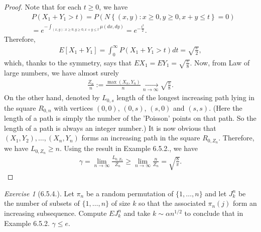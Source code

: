 \documentclass[12pt,a4paper]{amsart}
\theoremstyle{plain}
\theoremstyle{definition}
\theoremstyle{remark}
\newtheorem*{exe}{Exercise}
\numberwithin{equation}{section}
\begin{document}
\begin{proof}
Note that for each $t\geq 0$, we have
\begin{align}
&P(X_1+Y_1 > t) 
= P \left( N\left\{(x,y): x\geq 0, y\geq 0, x+y\leq t \right\} = 0 \right)
\\& = e^{- \int_{(x,y): x\geq 0, y\geq 0, x+y \leq t} \mu(dx,dy)}
= e^{-\frac{t^2}{2}}.
\end{align}
Therefore, 
\begin{align}
E[X_1+Y_1] 
= \int_0^\infty P(X_1 + Y_1 > t) dt 
= \sqrt{\frac{\pi}{2}},
\end{align}
which, thanks to the symmetry, says that $EX_1 = EY_1 = \sqrt{\frac{\pi}{8}}$.
Now, from Law of large numbers, we have almost surely
\begin{align}
\frac{Z_n}{n}:= \frac{\max(X_n,Y_n)}{n} \xrightarrow[n \to \infty]{} \sqrt{\frac{\pi}{8}}. 
\end{align}
On the other hand, denoted by $L_{0,s}$ length of the longest increasing path lying in the square $R_{0,n}$ with vertices $(0,0)$, $(0,s)$, $(s,0)$ and $(s,s)$.
(Here the length of a path is simply the number of the 'Poisson' points on that path. So the length of a path is always an integer number.)  
It is now obvious that $(X_1,Y_2),\dots, (X_n,Y_n)$ forms an increasing path in the square $R_{0, Z_n}$. 
Therefore, we have $L_{0,Z_n} \geq n$.
Using the result in Example 6.5.2., we have
\begin{align}
\gamma 
= \lim_{n\to \infty} \frac{L_{0, Z_n}}{ Z_n}  
\geq \lim_{n\to \infty} \frac{n}{ Z_n}
= \sqrt{\frac{8}{\pi}}.
\end{align}
\end{proof}
\begin{exe}[6.5.4.]
Let $\pi_n$ be a random permutation of $\{1,\dots,n\}$ and let $J_k^n$ be the number of subsets of $\{1,\dots,n\}$ of size $k$ so that the associated $\pi_n(j)$ form an increasing subsequence.
Compute $EJ_k^n$ and take $k\sim \alpha n^{1/2}$ to conclude that in Example 6.5.2. $\gamma \leq e$.
\end{exe}
\end{document}
